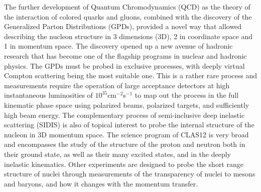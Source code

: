 \documentclass[final,3p,twocolumn]{elsarticle}
\begin{document}
The further development of Quantum Chromodynamics (QCD) as the theory of the interaction of colored quarks and
gluons, combined with the discovery of the Generalized Parton Distributions (GPDs), provided a novel way that allowed
describing the nucleon structure in 3 dimensions (3D), 2 in coordinate space and 1 in momentum space. The discovery
opened up a new avenue of hadronic research that has become one of the flagship programs in nuclear and hadronic
physics. The GPDs must be probed in exclusive processes, with deeply virtual Compton scattering being the most
suitable one. This is a rather rare process and measurements require the operation of large acceptance detectors 
at high instantaneous luminosities of $10^{35}$cm$^{-2}$s$^{-1}$ to map out the process in the full kinematic phase space using
polarized beams, polarized targets, and sufficiently high beam energy. The complementary process of semi-inclusive
deep inelastic scattering (SIDIS) is also of topical interest to probe the internal structure of the nucleon in 3D
momentum space. The science program of CLAS12 is very broad~\cite{Burkert:2018nvj} and encompasses the study
of the structure of the proton and neutron both in their ground state, as well as their many excited states, and in the
deeply inelastic kinematics. Other experiments are designed to probe the short range structure of nuclei through
measurements of the transparency of nuclei to mesons and baryons, and how it changes with the momentum transfer.   
\end{document}
